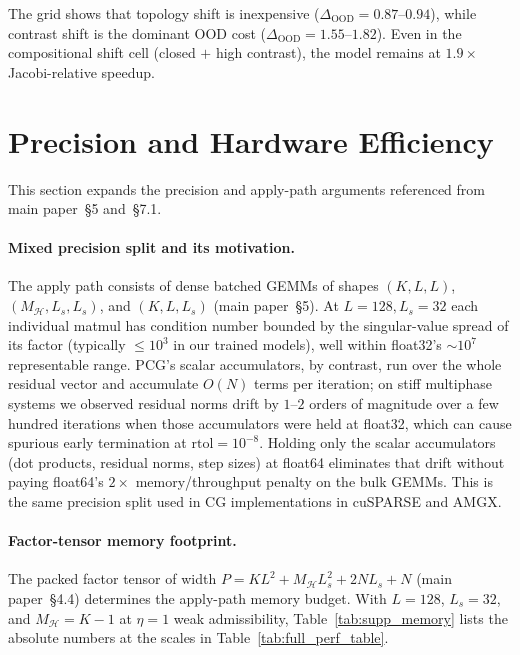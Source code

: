 \documentclass[acmtog]{acmart}
\begin{document}
The grid shows that topology shift is inexpensive
($\Delta_{\text{OOD}}\!=\!0.87$--$0.94$), while contrast shift is the dominant
OOD cost ($\Delta_{\text{OOD}}\!=\!1.55$--$1.82$). Even in the compositional
shift cell (closed $+$ high contrast), the model remains at $1.9\times$
Jacobi-relative speedup.

\section{Precision and Hardware Efficiency}
\label{supp:precision}

This section expands the precision and apply-path arguments referenced from main
paper~\S5 and~\S7.1.

\paragraph{Mixed precision split and its motivation.}
The apply path consists of dense batched GEMMs of shapes $(K, L, L)$,
$(M_{\mathcal{H}}, L_s, L_s)$, and $(K, L, L_s)$ (main paper~\S5). At
$L\!=\!128, L_s\!=\!32$ each individual matmul has condition number bounded by
the singular-value spread of its factor (typically $\le\!10^3$ in our trained
models), well within float32's $\sim\!10^7$ representable range. PCG's scalar
accumulators, by contrast, run over the whole residual vector and accumulate
$O(N)$ terms per iteration; on stiff multiphase systems we observed residual
norms drift by $1$--$2$ orders of magnitude over a few hundred iterations when
those accumulators were held at float32, which can cause spurious early
termination at $\mathrm{rtol}\!=\!10^{-8}$. Holding only the scalar
accumulators (dot products, residual norms, step sizes) at float64 eliminates
that drift without paying float64's $2\!\times$ memory/throughput penalty on
the bulk GEMMs. This is the same precision split used in CG implementations in
cuSPARSE and AMGX.

\paragraph{Factor-tensor memory footprint.}
The packed factor tensor of width $P\!=\!KL^2 + M_{\mathcal{H}} L_s^2 + 2NL_s + N$
(main paper~\S4.4) determines the apply-path memory budget. With $L\!=\!128$,
$L_s\!=\!32$, and $M_{\mathcal{H}}\!=\!K\!-\!1$ at $\eta\!=\!1$
weak admissibility, Table~\ref{tab:supp_memory} lists the absolute numbers at
the scales in Table~\ref{tab:full_perf_table}.
\end{document}
